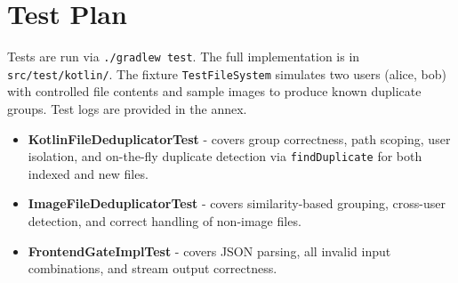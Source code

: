 \section{Test Plan}

Tests are run via \texttt{./gradlew test}. The full implementation is in \texttt{src/test/kotlin/}.
The fixture \texttt{TestFileSystem} simulates two users (alice, bob) with controlled file contents and sample images to produce known duplicate groups.
Test logs are provided in the annex.

\begin{itemize}[noitemsep, topsep=2pt]
    \item \textbf{KotlinFileDeduplicatorTest} - covers group correctness, path scoping, user isolation, and on-the-fly duplicate detection via \texttt{findDuplicate} for both indexed and new files.
    \item \textbf{ImageFileDeduplicatorTest} - covers similarity-based grouping, cross-user detection, and correct handling of non-image files.
    \item \textbf{FrontendGateImplTest} - covers JSON parsing, all invalid input combinations, and stream output correctness.
\end{itemize}
